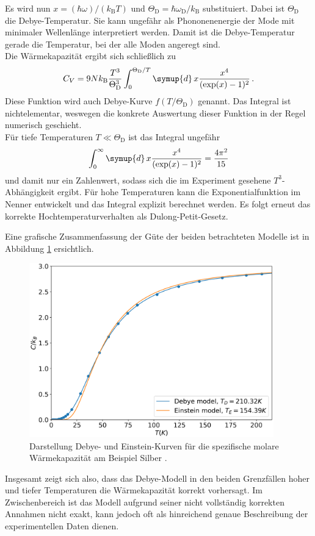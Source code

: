 Es wird nun $x = (\hbar \omega)/(k_\text{B} T)$ und $\Theta_\text{D} = \hbar \omega_\text{D} / k_\text{B}$ substituiert.
Dabei ist $\Theta_\text{D}$ die Debye-Temperatur. Sie kann ungefähr als Phononenenergie der Mode mit minimaler Wellenlänge interpretiert werden. Damit ist die Debye-Temperatur gerade die Temperatur, bei der alle Moden angeregt sind.\\
Die Wärmekapazität ergibt sich schließlich zu
\begin{equation}
  C_V = 9 N k_\text{B} \frac{T^3}{\Theta_\text{D}^3}\int_0^{\Theta_\text{D}/T} \symup{d}\,x \frac{x^4}{(\exp(x)-1)^2}\,.
  \label{eqn:cVDebye}
\end{equation}
Diese Funktion wird auch Debye-Kurve $f(T/\Theta_\text{D})$ genannt.
Das Integral ist nichtelementar, weswegen die konkrete Auswertung dieser Funktion in der Regel numerisch geschieht. \\
Für tiefe Temperaturen $T \ll \Theta_\text{D}$ ist das Integral ungefähr
\begin{equation}
  \int_0^{\infty} \symup{d}\,x \frac{x^4}{(\exp(x)-1)^2} = \frac{4\pi^2}{15}
  \label{eqn:theorieIntegral}
\end{equation}
und damit nur ein Zahlenwert, sodass sich die im Experiment gesehene $T^3$-Abhängigkeit ergibt. Für hohe Temperaturen kann die Exponentialfunktion im Nenner entwickelt und das Integral explizit berechnet werden. Es folgt erneut das korrekte Hochtemperaturverhalten als Dulong-Petit-Gesetz.

Eine grafische Zusammenfassung der Güte der beiden betrachteten Modelle ist in Abbildung \ref{fig:debyeEinstein} ersichtlich.

\begin{figure}
  \centering
  \includegraphics[width=300pt]{data/debyeEinsteinTheory.png}
  \caption{Darstellung Debye- und Einstein-Kurven für die spezifische molare Wärmekapazität am Beispiel Silber \cite{debyeEinstein}.}
  \label{fig:debyeEinstein}
\end{figure}

Insgesamt zeigt sich also, dass das Debye-Modell in den beiden Grenzfällen hoher und tiefer Temperaturen die Wärmekapazität korrekt vorhersagt. Im Zwischenbereich ist das Modell aufgrund seiner nicht vollständig korrekten Annahmen nicht exakt, kann jedoch oft als hinreichend genaue Beschreibung der experimentellen Daten dienen.
